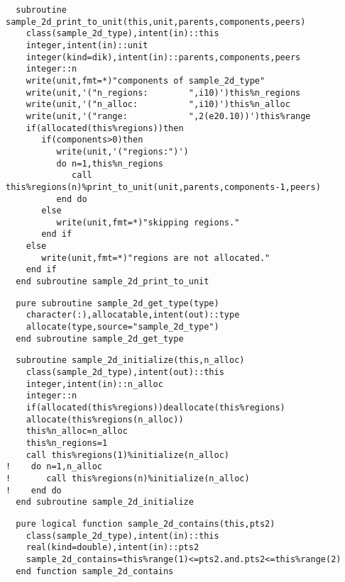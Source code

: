 \begin{Verbatim}
  subroutine sample_2d_print_to_unit(this,unit,parents,components,peers)
    class(sample_2d_type),intent(in)::this
    integer,intent(in)::unit
    integer(kind=dik),intent(in)::parents,components,peers
    integer::n
    write(unit,fmt=*)"components of sample_2d_type"
    write(unit,'("n_regions:        ",i10)')this%n_regions
    write(unit,'("n_alloc:          ",i10)')this%n_alloc
    write(unit,'("range:            ",2(e20.10))')this%range
    if(allocated(this%regions))then
       if(components>0)then
          write(unit,'("regions:")')
          do n=1,this%n_regions
             call this%regions(n)%print_to_unit(unit,parents,components-1,peers)
          end do
       else
          write(unit,fmt=*)"skipping regions."
       end if
    else
       write(unit,fmt=*)"regions are not allocated."
    end if
  end subroutine sample_2d_print_to_unit
\end{Verbatim}
 
\begin{Verbatim}
  pure subroutine sample_2d_get_type(type)
    character(:),allocatable,intent(out)::type
    allocate(type,source="sample_2d_type")
  end subroutine sample_2d_get_type
\end{Verbatim}

\begin{Verbatim}
  subroutine sample_2d_initialize(this,n_alloc)
    class(sample_2d_type),intent(out)::this
    integer,intent(in)::n_alloc
    integer::n
    if(allocated(this%regions))deallocate(this%regions)
    allocate(this%regions(n_alloc))
    this%n_alloc=n_alloc
    this%n_regions=1
    call this%regions(1)%initialize(n_alloc)
!    do n=1,n_alloc
!       call this%regions(n)%initialize(n_alloc)
!    end do
  end subroutine sample_2d_initialize
\end{Verbatim}

\begin{Verbatim}
  pure logical function sample_2d_contains(this,pts2)
    class(sample_2d_type),intent(in)::this
    real(kind=double),intent(in)::pts2
    sample_2d_contains=this%range(1)<=pts2.and.pts2<=this%range(2)
  end function sample_2d_contains
\end{Verbatim}
  
